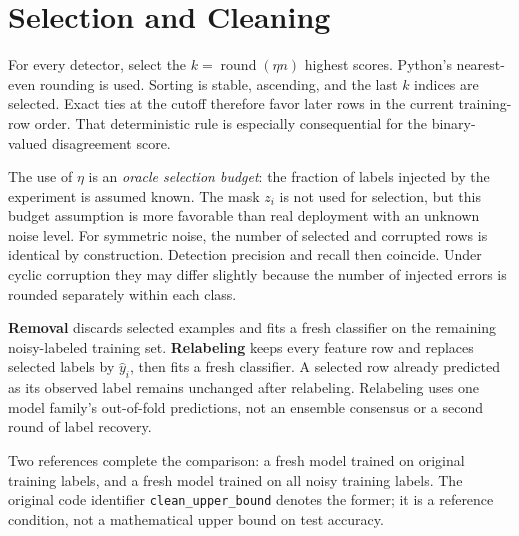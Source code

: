 \section{Selection and Cleaning}
For every detector, select the $k=\operatorname{round}(\eta n)$ highest scores.
Python's nearest-even rounding is used. Sorting is stable, ascending, and the
last $k$ indices are selected. Exact ties at the cutoff therefore favor later
rows in the current training-row order. That deterministic rule is especially
consequential for the binary-valued disagreement score.

The use of $\eta$ is an \emph{oracle selection budget}: the fraction of labels
injected by the experiment is assumed known. The mask $z_i$ is not used for
selection, but this budget assumption is more favorable than real deployment
with an unknown noise level. For symmetric noise, the number of selected and
corrupted rows is identical by construction. Detection precision and recall
then coincide. Under cyclic corruption they may differ slightly because the
number of injected errors is rounded separately within each class.

\textbf{Removal} discards selected examples and fits a fresh classifier on
the remaining noisy-labeled training set. \textbf{Relabeling} keeps every
feature row and replaces selected labels by $\widehat y_i$, then fits a fresh
classifier. A selected row already predicted as its observed label remains
unchanged after relabeling. Relabeling uses one model family's out-of-fold
predictions, not an ensemble consensus or a second round of label recovery.

Two references complete the comparison: a fresh model trained on original
training labels, and a fresh model trained on all noisy training labels.
The original code identifier \texttt{clean\_upper\_bound} denotes the former;
it is a reference condition, not a mathematical upper bound on test accuracy.


